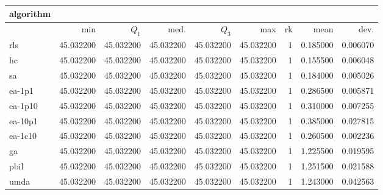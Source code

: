\begin{tabular}{@{}l*{5}{>{{}}N{2}{2}}>{{}}N{2}{0}>{{}}N{1}{2}>{{}}N{1}{2}@{}}
\toprule
{algorithm} &  &  \\
\midrule
& {min} & {$Q_1$} & {med.} & {$Q_3$} & {max} & {rk} & {mean} & {dev.} \\
\midrule
rls & {\color{blue}} 45.032200 & {\color{blue}} 45.032200 & {\color{blue}} 45.032200 & {\color{blue}} 45.032200 & {\color{blue}} 45.032200 & 1 & 0.185000 & 0.006070 \\
 hc & {\color{blue}} 45.032200 & {\color{blue}} 45.032200 & {\color{blue}} 45.032200 & {\color{blue}} 45.032200 & {\color{blue}} 45.032200 & 1 & 0.155500 & 0.006048 \\
 sa & {\color{blue}} 45.032200 & {\color{blue}} 45.032200 & {\color{blue}} 45.032200 & {\color{blue}} 45.032200 & {\color{blue}} 45.032200 & 1 & 0.184000 & 0.005026 \\
 ea-1p1 & {\color{blue}} 45.032200 & {\color{blue}} 45.032200 & {\color{blue}} 45.032200 & {\color{blue}} 45.032200 & {\color{blue}} 45.032200 & 1 & 0.286500 & 0.005871 \\
 ea-1p10 & {\color{blue}} 45.032200 & {\color{blue}} 45.032200 & {\color{blue}} 45.032200 & {\color{blue}} 45.032200 & {\color{blue}} 45.032200 & 1 & 0.310000 & 0.007255 \\
 ea-10p1 & {\color{blue}} 45.032200 & {\color{blue}} 45.032200 & {\color{blue}} 45.032200 & {\color{blue}} 45.032200 & {\color{blue}} 45.032200 & 1 & 0.385000 & 0.027815 \\
 ea-1c10 & {\color{blue}} 45.032200 & {\color{blue}} 45.032200 & {\color{blue}} 45.032200 & {\color{blue}} 45.032200 & {\color{blue}} 45.032200 & 1 & 0.260500 & 0.002236 \\
 ga & {\color{blue}} 45.032200 & {\color{blue}} 45.032200 & {\color{blue}} 45.032200 & {\color{blue}} 45.032200 & {\color{blue}} 45.032200 & 1 & 1.225500 & 0.019595 \\
 pbil & {\color{blue}} 45.032200 & {\color{blue}} 45.032200 & {\color{blue}} 45.032200 & {\color{blue}} 45.032200 & {\color{blue}} 45.032200 & 1 & 1.251500 & 0.021588 \\
 umda & {\color{blue}} 45.032200 & {\color{blue}} 45.032200 & {\color{blue}} 45.032200 & {\color{blue}} 45.032200 & {\color{blue}} 45.032200 & 1 & 1.243000 & 0.042563 \\
 \bottomrule
\end{tabular}
